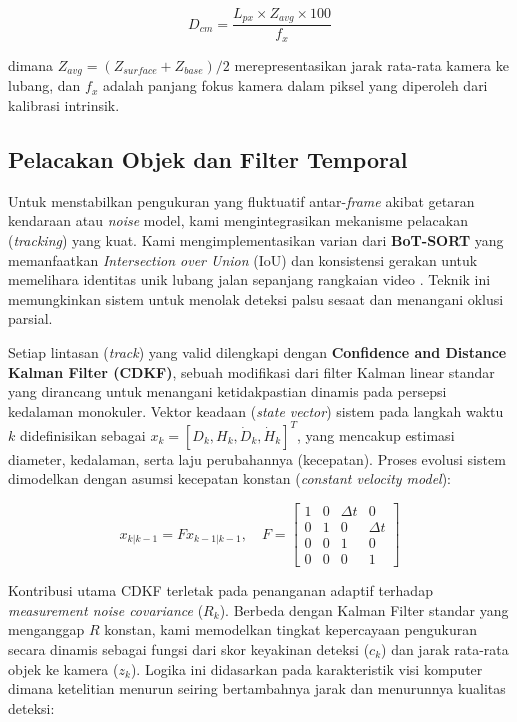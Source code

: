 \documentclass{iopjournal}
\begin{document}
\begin{equation}
D_{cm} = \frac{L_{px} \times Z_{avg} \times 100}{f_x}
\end{equation}

dimana $Z_{avg} = (Z_{surface} + Z_{base}) / 2$ merepresentasikan jarak rata-rata kamera ke lubang, dan $f_x$ adalah panjang fokus kamera dalam piksel yang diperoleh dari kalibrasi intrinsik.


\subsection{Pelacakan Objek dan Filter Temporal}
Untuk menstabilkan pengukuran yang fluktuatif antar-\textit{frame} akibat getaran kendaraan atau \textit{noise} model, kami mengintegrasikan mekanisme pelacakan (\textit{tracking}) yang kuat. Kami mengimplementasikan varian dari \textbf{BoT-SORT} yang memanfaatkan \textit{Intersection over Union} (IoU) dan konsistensi gerakan untuk memelihara identitas unik lubang jalan sepanjang rangkaian video \cite{aharon2022}. Teknik ini memungkinkan sistem untuk menolak deteksi palsu sesaat dan menangani oklusi parsial.

Setiap lintasan (\textit{track}) yang valid dilengkapi dengan \textbf{Confidence and Distance Kalman Filter (CDKF)}, sebuah modifikasi dari filter Kalman linear standar yang dirancang untuk menangani ketidakpastian dinamis pada persepsi kedalaman monokuler. Vektor keadaan (\textit{state vector}) sistem pada langkah waktu $k$ didefinisikan sebagai $x_k = [D_k, H_k, \dot{D}_k, \dot{H}_k]^T$, yang mencakup estimasi diameter, kedalaman, serta laju perubahannya (kecepatan). Proses evolusi sistem dimodelkan dengan asumsi kecepatan konstan (\textit{constant velocity model}):

\begin{equation}
x_{k|k-1} = F x_{k-1|k-1}, \quad F = \begin{bmatrix} 1 & 0 & \Delta t & 0 \\ 0 & 1 & 0 & \Delta t \\ 0 & 0 & 1 & 0 \\ 0 & 0 & 0 & 1 \end{bmatrix}
\end{equation}

Kontribusi utama CDKF terletak pada penanganan adaptif terhadap \textit{measurement noise covariance} ($R_k$). Berbeda dengan Kalman Filter standar yang menganggap $R$ konstan, kami memodelkan tingkat kepercayaan pengukuran secara dinamis sebagai fungsi dari skor keyakinan deteksi ($c_k$) dan jarak rata-rata objek ke kamera ($z_k$). Logika ini didasarkan pada karakteristik visi komputer dimana ketelitian menurun seiring bertambahnya jarak dan menurunnya kualitas deteksi:
\end{document}
